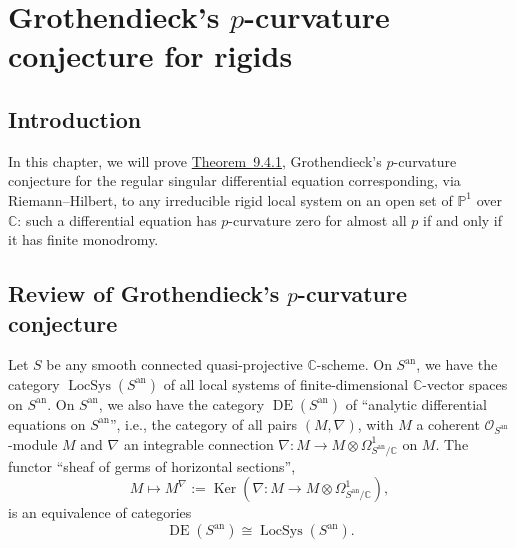 \chapter[Grothendieck's \texorpdfstring{\(p\)}{p}-curvature conjecture for rigids]{Grothendieck's \(p\)-curvature conjecture for rigids}
\label{chap:9}
\setcounter{section}{-1}

\section{Introduction}
\label{sec:9.0}

In this chapter, we will prove \hyperref[thm:9.4.1]{Theorem~9.4.1}, Grothendieck's \(p\)-curvature conjecture for the regular singular differential equation corresponding, via Riemann--Hilbert, to any irreducible rigid local system on an open set of \(\mathbb{P}^1\) over \(\mathbb{C}\): such a differential equation has \(p\)-curvature zero for almost all \(p\) if and only if it has finite monodromy.

\section[Review of Grothendieck's \texorpdfstring{\(p\)}{p}-curvature conjecture]{Review of Grothendieck's \(p\)-curvature conjecture}
\label{sec:9.1}

Let \(S\) be any smooth connected quasi-projective \(\mathbb{C}\)-scheme. On \(S^{\mathrm{an}}\), we have the category \(\operatorname{LocSys}(S^{\mathrm{an}})\) of all local systems of finite-dimensional \(\mathbb{C}\)-vector spaces on \(S^{\mathrm{an}}\). On \(S^{\mathrm{an}}\), we also have the category \(\operatorname{DE}(S^{\mathrm{an}})\) of ``analytic differential equations on \(S^{\mathrm{an}}\)'', i.e., the category of all pairs \((M,\nabla)\), with \(M\) a coherent \(\mathcal{O}_{S^{\mathrm{an}}}\)-module \(M\) and \(\nabla\) an integrable connection \(\nabla:M\to M\otimes\Omega^1_{S^{\mathrm{an}}/\mathbb{C}}\) on \(M\). The functor ``sheaf of germs of horizontal sections'',
\[
M\mapsto M^\nabla:=\operatorname{Ker}(\nabla:M\to M\otimes\Omega^1_{S^{\mathrm{an}}/\mathbb{C}}),
\]
is an equivalence of categories
\[
\operatorname{DE}(S^{\mathrm{an}})\cong\operatorname{LocSys}(S^{\mathrm{an}}).
\]

